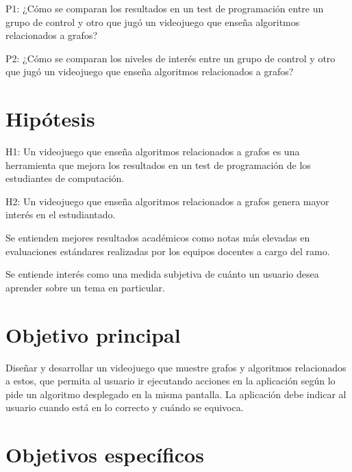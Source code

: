 \documentclass[submission]{eptcs}
\begin{document}
P1: ¿Cómo se comparan los resultados en un test de programación entre un grupo de control y otro que
jugó un videojuego que enseña algoritmos relacionados a grafos?

P2: ¿Cómo se comparan los niveles de interés entre un grupo de control y otro que jugó un videojuego
que enseña algoritmos relacionados a grafos?


\section{Hipótesis}

H1: Un videojuego que enseña algoritmos relacionados a grafos es una herramienta
que mejora los resultados en un test de programación de los estudiantes de computación.

H2: Un videojuego que enseña algoritmos relacionados a grafos genera mayor interés
en el estudiantado.

Se entienden mejores resultados académicos como notas más elevadas en evaluaciones estándares
realizadas por los equipos docentes a cargo del ramo.

Se entiende interés como una medida subjetiva de cuánto un usuario desea
aprender sobre un tema en particular. 

\section{Objetivo principal}



Diseñar y desarrollar un videojuego que muestre grafos y algoritmos relacionados a estos,
que permita al usuario ir ejecutando acciones en la aplicación según lo pide un algoritmo
desplegado en la misma pantalla. La aplicación debe indicar al usuario cuando está en lo
correcto y cuándo se equivoca.

\section{Objetivos específicos}
\end{document}
